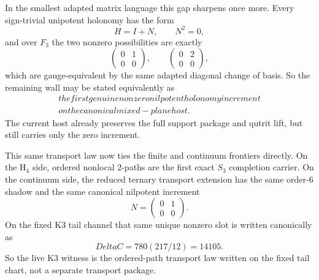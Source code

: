 \documentclass[12pt,a4paper]{article}
\def\mathbb#1{#1}%
\def\text#1{#1}%
\def\Delta{Delta}%
\def\cdot{ }%
\theoremstyle{definition}
\newcommand{\FF}{\mathbb{F}}
\begin{document}
In the smallest adapted matrix language this gap sharpens once more.
Every sign-trivial unipotent holonomy has the form
\[
H = I + N,
\qquad
N^2 = 0,
\]
and over $\FF_3$ the two nonzero possibilities are exactly
\[
\begin{pmatrix}0&1\\0&0\end{pmatrix},
\qquad
\begin{pmatrix}0&2\\0&0\end{pmatrix},
\]
which are gauge-equivalent by the same adapted diagonal change of basis.
So the remaining wall may be stated equivalently as
\[
\boxed{\;
\begin{array}{c}
\text{the first genuine nonzero nilpotent holonomy increment} \\
\text{on the canonical mixed-plane host.}
\end{array}
\;}
\]
The current host already preserves the full support package and qutrit
lift, but still carries only the zero increment.

This same transport law now ties the finite and continuum frontiers
directly.  On the H$_4$ side, ordered nonlocal $2$-paths are the first
exact $S_3$ completion carrier.  On the continuum side, the reduced
ternary transport extension has the same order-$6$ shadow and the same
canonical nilpotent increment
\[
N=\begin{pmatrix}0&1\\0&0\end{pmatrix}.
\]
On the fixed K3 tail channel that same unique nonzero slot is written
canonically as
\[
\Delta C = 780\cdot(217/12)=14105.
\]
So the live K3 witness is the ordered-path transport law written on the
fixed tail chart, not a separate transport package.
\end{document}

